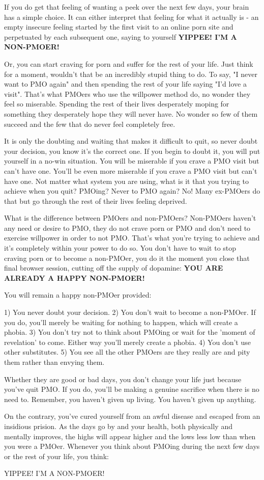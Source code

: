 If you do get that feeling of wanting a peek over the next few days, your brain has a simple choice. It can either interpret that feeling for what it actually is - an empty insecure feeling started by the first visit to an online porn site and perpetuated by each subsequent one, saying to yourself \textbf{YIPPEE! I'M A NON-PMOER!}

Or, you can start craving for porn and suffer for the rest of your life. Just think for a moment, wouldn't that be an incredibly stupid thing to do. To say, "I never want to PMO again" and then spending the rest of your life saying "I'd love a visit". That's what PMOers who use the willpower method do, no wonder they feel so miserable. Spending the rest of their lives desperately moping for something they desperately hope they will never have. No wonder so few of them succeed and the few that do never feel completely free.

It is only the doubting and waiting that makes it difficult to quit, so never doubt your decision, you know it's the correct one. If you begin to doubt it, you will put yourself in a no-win situation. You will be miserable if you crave a PMO visit but can't have one. You'll be even more miserable if you crave a PMO visit but can't have one. Not matter what system you are using, what is it that you trying to achieve when you quit? PMOing? Never to PMO again? No! Many ex-PMOers do that but go through the rest of their lives feeling deprived.

What is the difference between PMOers and non-PMOers? Non-PMOers haven't any need or desire to PMO, they do not crave porn or PMO and don't need to exercise willpower in order to not PMO. That's what you're trying to achieve and it's completely within your power to do so. You don't have to wait to stop craving porn or to become a non-PMOer, you do it the moment you close that final browser session, cutting off the supply of dopamine: \textbf{YOU ARE ALREADY A HAPPY NON-PMOER!}

  You will remain a happy non-PMOer provided:

  1) You never doubt your decision.
  2) You don't wait to become a non-PMOer. If you do, you'll merely be waiting for nothing to happen, which will create a phobia.
  3) You don't try not to think about PMOing or wait for the 'moment of revelation' to come. Either way you'll merely create a phobia.
  4) You don't use other substitutes.
  5) You see all the other PMOers are they really are and pity them rather than envying them.

  Whether they are good or bad days, you don't change your life just because you've quit PMO. If you do, you'll be making a genuine sacrifice when there is no need to. Remember, you haven't given up living. You haven't given up anything.

On the contrary, you've cured yourself from an awful disease and escaped from an insidious prision. As the days go by and your health, both physically and mentally improves, the highs will appear higher and the lows less low than when you were a PMOer. Whenever you think about PMOing during the next few days or the rest of your life, you think:

\huge{YIPPEE! I'M A NON-PMOER!}
